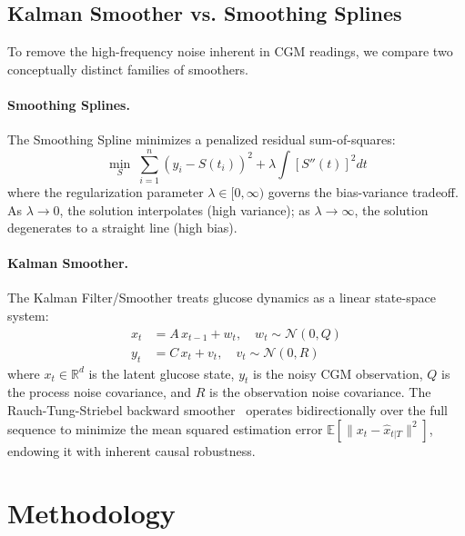 \documentclass[pmlr,twocolumn,10pt]{jmlr} %
\begin{document}
\subsection{Kalman Smoother vs. Smoothing Splines}

To remove the high-frequency noise inherent in CGM readings, we compare two conceptually distinct families of smoothers.

\paragraph{Smoothing Splines.}
The Smoothing Spline minimizes a penalized residual sum-of-squares:
\begin{equation}
    \min_S \;\sum_{i=1}^n \left(y_i - S(t_i)\right)^2 + \lambda \int \left[S''(t)\right]^2 dt
    \label{eq:smooth_spline}
\end{equation}
where the regularization parameter $\lambda \in [0, \infty)$ governs the bias-variance tradeoff. As $\lambda \to 0$, the solution interpolates (high variance); as $\lambda \to \infty$, the solution degenerates to a straight line (high bias).

\paragraph{Kalman Smoother.}
The Kalman Filter/Smoother treats glucose dynamics as a linear state-space system:
\begin{align}
    x_t &= A\, x_{t-1} + w_t, \quad w_t \sim \mathcal{N}(0, Q) \label{eq:kalman_state}\\
    y_t &= C\, x_t + v_t, \quad v_t \sim \mathcal{N}(0, R) \label{eq:kalman_obs}
\end{align}
where $x_t \in \mathbb{R}^d$ is the latent glucose state, $y_t$ is the noisy CGM observation, $Q$ is the process noise covariance, and $R$ is the observation noise covariance. The Rauch-Tung-Striebel backward smoother~\citep{facchinetti2015kalman} operates bidirectionally over the full sequence to minimize the mean squared estimation error $\mathbb{E}[\|x_t - \hat{x}_{t|T}\|^2]$, endowing it with inherent causal robustness.

\section{Methodology}
\end{document}
